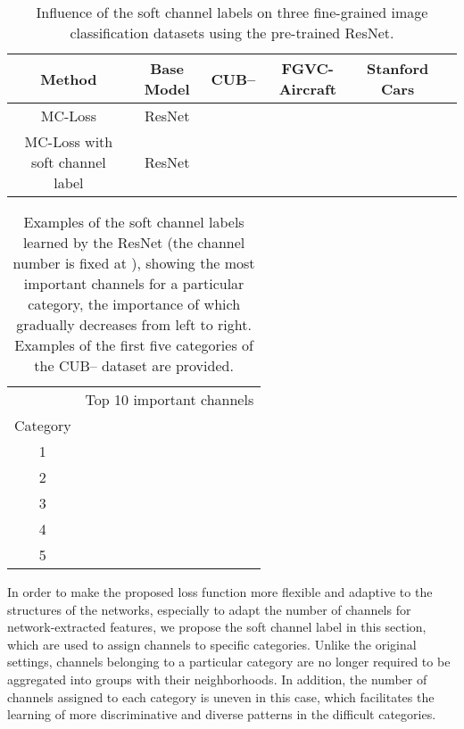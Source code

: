 \documentclass[journal]{IEEEtran}
\begin{document}
\begin{table*}[!t]
  \centering
  \small
\caption{Influence of the soft channel labels on three fine-grained image classification datasets using the pre-trained ResNet.}
    \begin{tabular}{|c|c|c|c|c|c|}
    \hline
    Method                                 & Base Model   & CUB--     & FGVC-Aircraft     & Stanford Cars \\
    \hline
    \hline
MC-Loss&                               ResNet     &                &             &   \\          
MC-Loss with soft channel label&       ResNet     &                &             &   \\       
\hline
    \end{tabular}\label{tab:soft}\end{table*}

\begin{table*}[!t]
  \centering
  \caption{Examples of the soft channel labels learned by the  ResNet (the channel number is fixed at ), showing the  most important channels for a particular category, the importance of which gradually decreases from left to right. Examples of the first five categories of the  CUB-- dataset are provided.}
    \begin{tabular}{|c|cccccccccc|}
    \hline
          & \multicolumn{10}{c|}{Top 10 important channels}\\
\cline{2-11}    Category   &      &      &      &      &      &      &      &      &      &  \\
    \hline
    \hline
    1                   &    &   &   &    &    &    &    &   &   &  \\
    2                   &    &   &   &    &   &   &   &    &   &  \\
    3                   &    &   &   &    &    &   &   &    &   &  \\
    4                   &    &   &    &    &   &    &   &    &   &  \\
    5                   &   &    &    &   &   &   &   &    &   &  \\
    \hline
    \end{tabular}\label{tab:channels}\end{table*}



In order to make the proposed loss function more flexible and adaptive to the structures of the networks, especially to adapt the number of channels for network-extracted features, we propose the soft channel label in this section, which are used to assign channels to specific categories. Unlike the original settings, channels belonging to a particular category are no longer required to be aggregated into groups with their neighborhoods. In addition, the number of channels assigned to each category is uneven  in this case, which facilitates the learning of more discriminative and diverse patterns  in  the difficult categories. 
\end{document}
